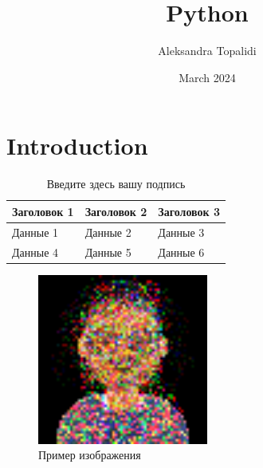 \documentclass{article}
\title{Python}
\author{Aleksandra Topalidi}
\date{March 2024}
\begin{document}
\maketitle

\section{Introduction}

\begin{table}[h!]
\centering
\begin{tabular}{|l|l|l|}
\hline
Заголовок 1 & Заголовок 2 & Заголовок 3 \\\hline
Данные 1 & Данные 2 & Данные 3 \\\hline
Данные 4 & Данные 5 & Данные 6 \\\hline
\end{tabular}
\caption{Введите здесь вашу подпись}
\end{table}

\begin{figure}[h!]
\centering
\includegraphics[width=0.5\textwidth]{generated_avatar_4.png}
\caption{Пример изображения}
\end{figure}
\end{document}
